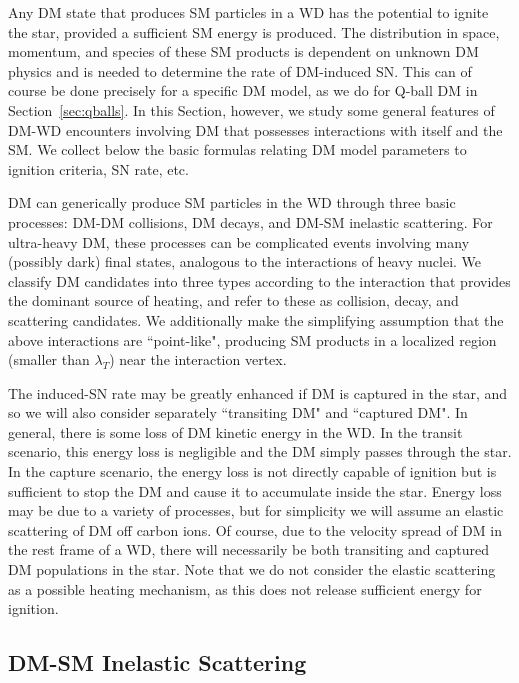 Any DM state that produces SM particles in a WD has the potential to ignite the star, provided a sufficient SM energy is produced. 
The distribution in space, momentum, and species of these SM products is dependent on unknown DM physics and is needed to determine the rate of DM-induced SN. 
This can of course be done precisely for a specific DM model, as we do for Q-ball DM in Section~\ref{sec:qballs}.
In this Section, however, we study some general features of DM-WD encounters involving DM that possesses interactions with itself and the SM. 
We collect below the basic formulas relating DM model parameters to ignition criteria, SN rate, etc. 

DM can generically produce SM particles in the WD through three basic processes: DM-DM collisions, DM decays, and DM-SM inelastic scattering.
For ultra-heavy DM, these processes can be complicated events involving many (possibly dark) final states, analogous to the interactions of heavy nuclei.
We classify DM candidates into three types according to the interaction that provides the dominant source of heating, and refer to these as collision, decay, and scattering candidates.
We additionally make the simplifying assumption that the above interactions are ``point-like", producing SM products in a localized region (smaller than $\lambda_T$) near the interaction vertex.

The induced-SN rate may be greatly enhanced if DM is captured in the star, and so we will also consider separately ``transiting DM" and ``captured DM". 
In general, there is some loss of DM kinetic energy in the WD. 
In the transit scenario, this energy loss is negligible and the DM simply passes through the star.
In the capture scenario, the energy loss is not directly capable of ignition but is sufficient to stop the DM and cause it to accumulate inside the star.
Energy loss may be due to a variety of processes, but for simplicity we will assume an elastic scattering of DM off carbon ions. 
Of course, due to the velocity spread of DM in the rest frame of a WD, there will necessarily be both transiting and captured DM populations in the star. 
Note that we do not consider the elastic scattering as a possible heating mechanism, as this does not release sufficient energy for ignition. 

\subsection{DM-SM Inelastic Scattering}

